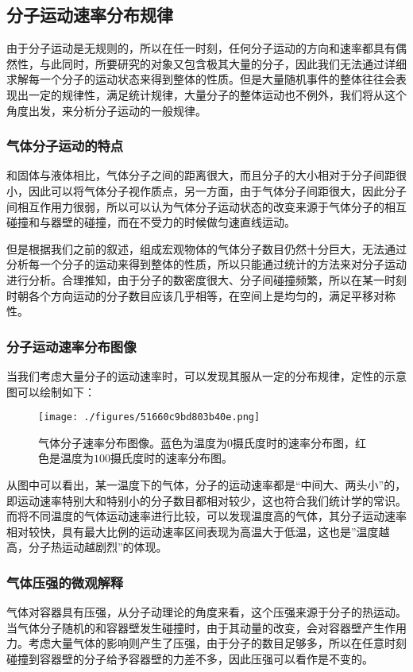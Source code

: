 \subsection{分子运动速率分布规律}
由于分子运动是无规则的，所以在任一时刻，任何分子运动的方向和速率都具有偶然性，与此同时，所要研究的对象又包含极其大量的分子，因此我们无法通过详细求解每一个分子的运动状态来得到整体的性质。但是大量随机事件的整体往往会表现出一定的规律性，满足统计规律，大量分子的整体运动也不例外，我们将从这个角度出发，来分析分子运动的一般规律。

\subsubsection{气体分子运动的特点}
和固体与液体相比，气体分子之间的距离很大，而且分子的大小相对于分子间距很小，因此可以将气体分子视作质点，另一方面，由于气体分子间距很大，因此分子间相互作用力很弱，所以可以认为气体分子运动状态的改变来源于气体分子的相互碰撞和与器壁的碰撞，而在不受力的时候做匀速直线运动。

但是根据我们之前的叙述，组成宏观物体的气体分子数目仍然十分巨大，无法通过分析每一个分子的运动来得到整体的性质，所以只能通过统计的方法来对分子运动进行分析。合理推知，由于分子的数密度很大、分子间碰撞频繁，所以在某一时刻时朝各个方向运动的分子数目应该几乎相等，在空间上是均匀的，满足平移对称性。

\subsubsection{分子运动速率分布图像}
当我们考虑大量分子的运动速率时，可以发现其服从一定的分布规律，定性的示意图可以绘制如下：
\begin{figure}[ht]
\centering
\texttt{[image: ./figures/51660c9bd803b40e.png]}
\caption{气体分子速率分布图像。蓝色为温度为$0$摄氏度时的速率分布图，红色是温度为$100$摄氏度时的速率分布图。} \label{fig_thermo_maxwell}
\end{figure}
从图中可以看出，某一温度下的气体，分子的运动速率都是“中间大、两头小”的，即运动速率特别大和特别小的分子数目都相对较少，这也符合我们统计学的常识。而将不同温度的气体运动速率进行比较，可以发现温度高的气体，其分子运动速率相对较快，具有最大比例的运动速率区间表现为高温大于低温，这也是”温度越高，分子热运动越剧烈”的体现。

\subsubsection{气体压强的微观解释}
气体对容器具有压强，从分子动理论的角度来看，这个压强来源于分子的热运动。当气体分子随机的和容器壁发生碰撞时，由于其动量的改变，会对容器壁产生作用力。考虑大量气体的影响则产生了压强，由于分子的数目足够多，所以在任意时刻碰撞到容器壁的分子给予容器壁的力差不多，因此压强可以看作是不变的。

